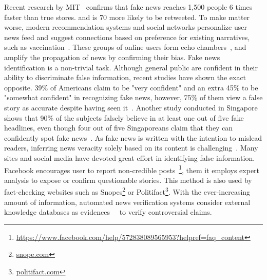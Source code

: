 \documentclass[fyp]{socreport}
\theoremstyle{definition}
\theoremstyle{hypothesis}
\begin{document}
Recent research by MIT~\cite{vosoughi2018spread} confirms that fake news reaches 1,500 people 6 times faster than true stores. and is 70 more likely to be retweeted. To make matter worse, modern recommendation systems and social networks personalize user news feed and suggest connections based on preference for existing narratives, such as vaccination~\cite{ludolph2016manipulating}. These groups of online users form echo chambers~\cite{quattrociocchi2016echo}, and amplify the propagation of news by confirming their bias. 
Fake news identification is a non-trivial task. Although general public are confident in their ability to discriminate false information, recent studies have shown the exact opposite. 39\% of Americans claim to be "very confident" and an extra 45\% to be "somewhat confident" in recognizing fake news, however, 75\% of them view a false story as accurate despite having seen it~\cite{edkins_2016}. Another study conducted in Singapore shows that 90\% of the subjects falsely believe in at least one out of five fake headlines, even though four out of five Singaporeans claim that they can confidently spot fake news~\cite{ng_2018}. As fake news is written with the intention to mislead readers, inferring news veracity solely based on its content is challenging~\cite{shu2017fake}. Many sites and social media have devoted great effort in identifying false information. Facebook encourages user to report non-credible posts~\footnote{\scriptsize{\url{https://www.facebook.com/help/572838089565953?helpref=faq_content}}}, them it employs expert analysis to expose or confirm questionable stories. This method is also used by fact-checking websites such as Snopes\footnote{\scriptsize{\url{snope.com}}} or Politifact\footnote{\scriptsize{\url{politifact.com}}}. With the ever-increasing amount of information, automated news verification systems consider external knowledge databases as evidences~\cite{hassan2017claimbuster}~\cite{thorne2017extensible} to verify controversial claims. 
\end{document}
